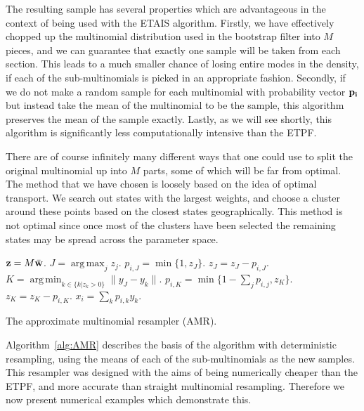 \documentclass[final]{siamltex}
\renewcommand{\b}[1]{{\bf #1}}
\DeclareMathOperator*{\argmin}{arg\,min}
\DeclareMathOperator*{\argmax}{arg\,max}
\begin{document}
The resulting sample has several properties which are advantageous in
the context of being used with the ETAIS algorithm. Firstly, we have
effectively chopped up the multinomial distribution used in the
bootstrap filter into $M$ pieces, and we can guarantee that exactly
one sample will be taken from each section. This leads to a much
smaller chance of losing entire modes in the density, if each of the
sub-multinomials is picked in an appropriate fashion. Secondly, if we do not make a random sample for
each multinomial with probability vector $\bf p_i$ but instead take
the mean of the multinomial to be the sample, this algorithm preserves
the mean of the sample exactly. Lastly, as we will see shortly, this
algorithm is significantly less computationally intensive than the
ETPF.

There are of course infinitely many different ways that one could use
to split the original multinomial up into $M$ parts, some of which
will be far from optimal. The method that we have chosen is loosely
based on the idea of optimal transport. We search out states with the
largest weights, and choose a cluster around these points based on
the closest states geographically. This method is not optimal since
once most of the clusters have been selected the remaining states
may be spread across the parameter space.

\begin{table}[!ht]
\centering
\begin{algorithm}[H]
\DontPrintSemicolon
\BlankLine
	$\b{z} = M\bar{\b{w}}$.\;
	{
		$J = \argmax_j z_j$.\;
		$p_{i,J} = \min\{1,z_J\}$.\;
		$z_J = z_J - p_{i,J}$.\;
		{
			$K = \argmin_{k \in \{k|z_k>0\}} \|y_J - y_k\|$.\;
			$p_{i,K} = \min\{1-\sum_j p_{i,j}, z_K\}$.\;
			$z_K = z_K - p_{i,K}$.\;
		}
		$x_i = \sum_k p_{i,k}y_k$.\;
	}
\caption{The approximate multinomial resampler (AMR).\label{alg:AMR}}
\end{algorithm}
\end{table}

Algorithm~\ref{alg:AMR} describes the basis of the algorithm with
deterministic resampling, using the means of each of the
sub-multinomials as the new samples. This resampler was designed with the aims of being
numerically cheaper than the ETPF, and more accurate than straight multinomial
resampling. Therefore we now present numerical examples which
demonstrate this.
\end{document}
